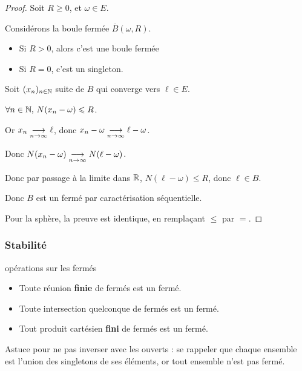 \begin{proof}
    Soit $R \geqslant 0$, et $\omega \in E$.

    Considérons la boule fermée $\overline{B}(\omega, R)$.

    \begin{itemize}
        \item Si $R > 0$, alors c'est une boule fermée
        \item Si $R = 0$, c'est un singleton. 
    \end{itemize}

    Soit $(x_n)_{n \in \mathbb{N}}$ suite de $B$ qui converge vers $\ell \in E$.

    $\forall n \in \mathbb{N}, \, N(x_n - \omega) \leqslant R$.

    Or $x_n \underset{n \to \infty}{\longrightarrow} \ell$, donc $x_n - \omega \underset{n \to \infty}{\longrightarrow} \ell - \omega$.

    Donc $N(x_n - \omega) \underset{n \to \infty}{\longrightarrow} N(\ell - \omega)$.

    Donc par passage à la limite dans $\mathbb{R}$, $N(\ell - \omega ) \leqslant R$, donc $\ell \in B$.

    Donc $B$ est un fermé par caractérisation séquentielle.

    Pour la sphère, la preuve est identique, en remplaçant $\leqslant$ par $=$.
\end{proof}


\subsubsection{Stabilité }

\begin{proposition}{opérations sur les fermés}{}
    \begin{itemize}
        \item Toute réunion \textbf{finie} de fermés est un fermé.
        \item Toute intersection quelconque de fermés est un fermé.
        \item Tout produit cartésien \textbf{fini} de fermés est un fermé.
    \end{itemize}
\end{proposition}

Astuce pour ne pas inverser avec les ouverts : se rappeler que chaque ensemble est l'union des singletons 
de ses éléments, or tout ensemble n'est pas fermé. 


